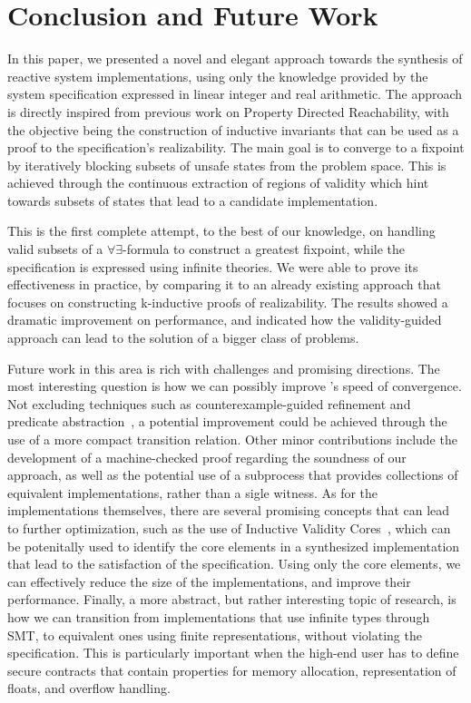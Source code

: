 \section{Conclusion and Future Work}
\label{sec:conclusion}

In this paper, we presented a novel and elegant approach towards the synthesis
of reactive system implementations, using only the knowledge provided by the
system specification expressed in linear integer and real arithmetic. The approach is
directly inspired from previous work on Property Directed Reachability, with the objective being the construction of inductive
invariants that can be used as a proof to the specification's realizability. The
main goal is to converge to a fixpoint by iteratively blocking subsets of
unsafe states from the problem space. This is achieved through the continuous
extraction of regions of validity which hint towards subsets of states that
lead to a candidate implementation.

This is the first complete attempt, to the best of our knowledge, on handling
valid subsets of a $\forall\exists$-formula to construct a greatest fixpoint,
while the specification is expressed using infinite theories. We were able to
prove its effectiveness in practice, by comparing it to an already existing
approach that focuses on constructing k-inductive proofs of realizability. The
results showed a dramatic improvement on performance, and indicated how the
validity-guided approach can lead to the solution of a bigger class of problems.

Future work in this area is rich with challenges and promising directions. The
most interesting question is how we can possibly improve \jsynvg's
speed of convergence. Not excluding techniques such as counterexample-guided
refinement and predicate abstraction~\cite{walker2014predicate}, a potential
improvement could be achieved through the use of a more compact transition
relation. Other minor contributions include the development of a  machine-checked
proof regarding the soundness of our approach, as well as the potential use of a
subprocess that provides collections of equivalent implementations, rather than
a sigle witness. As for the implementations themselves, there are
several promising concepts that can lead to further optimization, such as the use of Inductive Validity Cores~\cite{Ghass16}, which can be potenitally used to identify the core elements in a synthesized implementation that lead to the satisfaction of the specification. Using only
the core elements, we can effectively reduce the size of the implementations,
and improve their performance. Finally, a more abstract, but rather interesting
topic of research, is how we can transition from implementations that use
infinite types through SMT, to equivalent ones using finite representations,
without violating the specification. This is particularly important when the
high-end user has to define secure contracts that contain properties for memory
allocation, representation of floats, and overflow handling.
